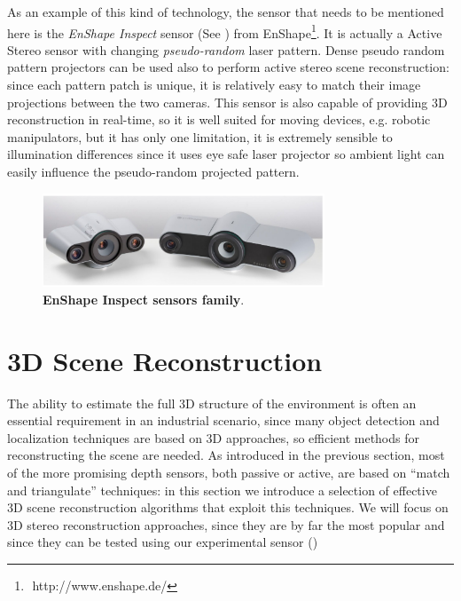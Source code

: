 As an example of this kind of technology, the sensor that needs to be mentioned here is the \emph{EnShape Inspect} sensor (See ) from EnShape\footnote{​ http://www.enshape.de/}. It is actually a Active Stereo sensor with changing \emph{pseudo-random} laser pattern. Dense pseudo random pattern projectors can be used also to perform active stereo scene reconstruction: since each pattern patch is unique, it is relatively easy to match their image projections between the two cameras. This sensor is also capable of providing 3D reconstruction in real-time, so it is well suited for moving devices, e.g. robotic manipulators, but it has only one limitation, it is extremely sensible to illumination differences since it uses eye safe laser projector so ambient light can easily influence the pseudo-random projected pattern.

\begin{figure}
    \centering
    \includegraphics[width=0.75\textwidth]{figures/1_perception_and_sensing_in_robotics/enshape}
    \caption{\textbf{EnShape Inspect sensors family}.} 
    \label{fig:enshape}
\end{figure}

\section{3D Scene Reconstruction}\label{sec:3dreconstruction}
The ability to estimate the full 3D structure of the environment is often an essential requirement in an industrial scenario, since many object detection and localization techniques are based on 3D approaches, so efficient methods for reconstructing the scene are needed. As introduced in the previous section, most of the more promising depth sensors, both passive or active, are based on ``match and triangulate'' techniques: in this section we introduce a selection of effective 3D scene reconstruction algorithms that exploit this techniques. We will focus on 3D stereo reconstruction approaches, since they are by far the most popular and since they can be tested using our experimental sensor ()

